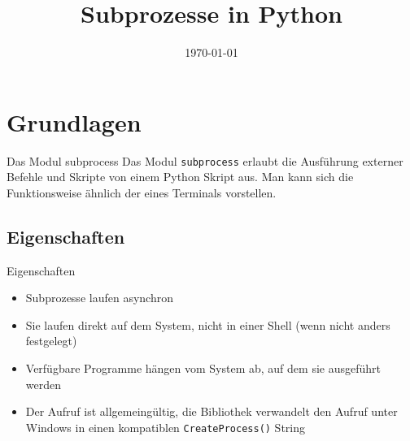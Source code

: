 


\newcommand{\topic}{
	Subprozesse in Python
}

\title{\topic}
\supertitle{\course}
\date{\today}



\maketitle

\begin{frame}
	\tableofcontents
\end{frame}


\section{Grundlagen}
\begin{frame}[fragile]{Das Modul subprocess}
	Das Modul \texttt{subprocess} erlaubt die Ausf\"uhrung externer Befehle und
	Skripte von einem Python Skript aus. Man kann sich die Funktionsweise \"ahnlich
	der eines Terminals vorstellen.
\end{frame}


\subsection{Eigenschaften}
\begin{frame}[fragile]{Eigenschaften}
	\begin{itemize}
		\item Subprozesse laufen asynchron
		\item Sie laufen direkt auf dem System, nicht in einer Shell
		(wenn nicht anders festgelegt)
		\item Verf\"ugbare Programme h\"angen vom System ab, auf dem sie ausgef\"uhrt werden
		\item Der Aufruf ist allgemeing\"ultig, die Bibliothek verwandelt den
		Aufruf unter Windows in einen kompatiblen \texttt{CreateProcess()} String
	\end{itemize}
\end{frame}


